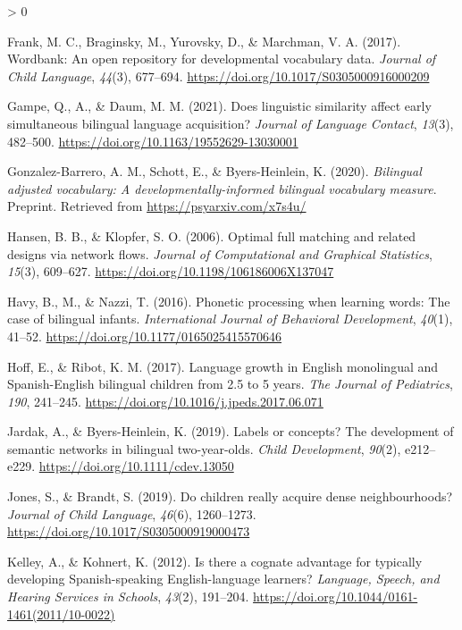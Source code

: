 \documentclass[
  english,
  ,man,floatsintext]{apa6}
\newlength{\cslhangindent}
\newenvironment{CSLReferences}[2] %
 {%
  \setlength{\parindent}{0pt}
  \ifodd #1 \everypar{\setlength{\hangindent}{\cslhangindent}}\ignorespaces\fi
  \ifnum #2 > 0
  \setlength{\parskip}{#2\baselineskip}
  \fi
 }%
 {}
\begin{document}
\begin{CSLReferences}{1}{0}
\leavevmode\hypertarget{ref-Frank_etal_2017}{}%
Frank, M. C., Braginsky, M., Yurovsky, D., \& Marchman, V. A. (2017). Wordbank: An open repository for developmental vocabulary data. \emph{Journal of Child Language}, \emph{44}(3), 677--694. \url{https://doi.org/10.1017/S0305000916000209}

\leavevmode\hypertarget{ref-Gampe_etal_2021}{}%
Gampe, Q., A., \& Daum, M. M. (2021). Does linguistic similarity affect early simultaneous bilingual language acquisition? \emph{Journal of Language Contact}, \emph{13}(3), 482--500. \url{https://doi.org/10.1163/19552629-13030001}

\leavevmode\hypertarget{ref-Gonzalez-Barrero_2020}{}%
Gonzalez-Barrero, A. M., Schott, E., \& Byers-Heinlein, K. (2020). \emph{Bilingual adjusted vocabulary: A developmentally-informed bilingual vocabulary measure}. Preprint. Retrieved from \url{https://psyarxiv.com/x7s4u/}

\leavevmode\hypertarget{ref-Hanson_Klopfer_2006}{}%
Hansen, B. B., \& Klopfer, S. O. (2006). Optimal full matching and related designs via network flows. \emph{Journal of Computational and Graphical Statistics}, \emph{15}(3), 609--627. \url{https://doi.org/10.1198/106186006X137047}

\leavevmode\hypertarget{ref-Havy_etal_2016}{}%
Havy, B., M., \& Nazzi, T. (2016). Phonetic processing when learning words: The case of bilingual infants. \emph{International Journal of Behavioral Development}, \emph{40}(1), 41--52. \url{https://doi.org/10.1177/0165025415570646}

\leavevmode\hypertarget{ref-Hoff_Ribot_2017}{}%
Hoff, E., \& Ribot, K. M. (2017). Language growth in {E}nglish monolingual and {S}panish-{E}nglish bilingual children from 2.5 to 5 years. \emph{The Journal of Pediatrics}, \emph{190}, 241--245. \url{https://doi.org/10.1016/j.jpeds.2017.06.071}

\leavevmode\hypertarget{ref-Jardak_Byers-Heinlein_2019}{}%
Jardak, A., \& Byers-Heinlein, K. (2019). Labels or concepts? The development of semantic networks in bilingual two-year-olds. \emph{Child Development}, \emph{90}(2), e212--e229. \url{https://doi.org/10.1111/cdev.13050}

\leavevmode\hypertarget{ref-Jones_Brandt_2019}{}%
Jones, S., \& Brandt, S. (2019). Do children really acquire dense neighbourhoods? \emph{Journal of Child Language}, \emph{46}(6), 1260--1273. \url{https://doi.org/10.1017/S0305000919000473}

\leavevmode\hypertarget{ref-Kelley_Kohnert_2012}{}%
Kelley, A., \& Kohnert, K. (2012). Is there a cognate advantage for typically developing {S}panish-speaking {E}nglish-language learners? \emph{Language, Speech, and Hearing Services in Schools}, \emph{43}(2), 191--204. \url{https://doi.org/10.1044/0161-1461(2011/10-0022)}


\end{CSLReferences}
\end{document}
